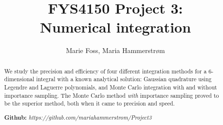 \documentclass{article}
\title{\textbf{FYS4150 Project 3: \\Numerical integration}}
\author{Marie Foss, Maria Hammerstr{{\o}}m}
\date{} %
\begin{document}
\maketitle

\begin{abstract}
	\noindent We study the precision and efficiency of four different integration methods for a 6-dimensional integral with a known analytical solution: Gaussian quadrature using Legendre and Laguerre polynomials, and Monte Carlo integration with and without importance sampling. The Monte Carlo method \textit{with} importance sampling proved to be the superior method, both when it came to precision and speed. 
	\vspace*{2ex}
	
	\noindent \textbf{Github:} \textit{https://github.com/mariahammerstrom/Project3}
	\vspace*{2ex}
\end{abstract}
\end{document}
